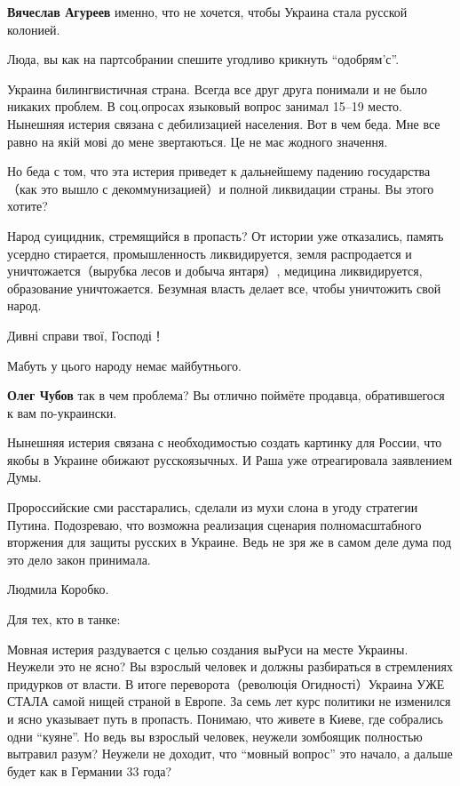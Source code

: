 \begin{itemize}
\begin{itemize}
\textbf{Вячеслав Агуреев} именно, что не хочется, чтобы Украина стала русской колонией.


Люда, вы как на партсобрании спешите угодливо крикнуть \enquote{одобрям'с}.

Украина билингвистичная страна. Всегда все друг друга понимали и не было
никаких проблем. В соц.опросах языковый вопрос занимал 15--19 место. Нынешняя
истерия связана с дебилизацией населения. Вот в чем беда. Мне все равно на якій
мові до мене звертаються. Це не має жодного значення.

Но беда с том, что эта истерия приведет к дальнейшему падению государства（как
это вышло с декоммунизацией）и полной ликвидации страны. Вы этого хотите?

Народ суицидник, стремящийся в пропасть? От истории уже отказались, память
усердно стирается, промышленность ликвидируется, земля распродается и
уничтожается（вырубка лесов и добыча янтаря）, медицина ликвидируется,
образование уничтожается. Безумная власть делает все, чтобы уничтожить свой
народ.

Дивні справи твої, Господі！

Мабуть у цього народу немає майбутнього.

\textbf{Олег Чубов} так в чем проблема? Вы отлично поймёте продавца, обратившегося к вам по-украински.

Нынешняя истерия связана с необходимостью создать картинку для России, что
якобы в Украине обижают русскоязычных. И Раша уже отреагировала заявлением
Думы.

Пророссийские сми расстарались, сделали из мухи слона в угоду стратегии Путина.
Подозреваю, что возможна реализация сценария полномасштабного вторжения для
защиты русских в Украине. Ведь не зря же в самом деле дума под это дело закон
принимала.

Людмила Коробко.

Для тех, кто в танке:

Мовная истерия раздувается с целью создания выРуси на месте Украины. Неужели
это не ясно? Вы взрослый человек и должны разбираться в стремлениях придурков
от власти. В итоге переворота（революція Огидності）Украина УЖЕ СТАЛА самой
нищей страной в Европе. За семь лет курс политики не изменился и ясно указывает
путь в пропасть. Понимаю, что живете в Киеве, где собрались одни \enquote{куяне}. Но
ведь вы взрослый человек, неужели зомбоящик полностью вытравил разум? Неужели
не доходит, что \enquote{мовный вопрос} это начало, а дальше будет как в Германии 33
года?


\end{itemize}
\end{itemize}

